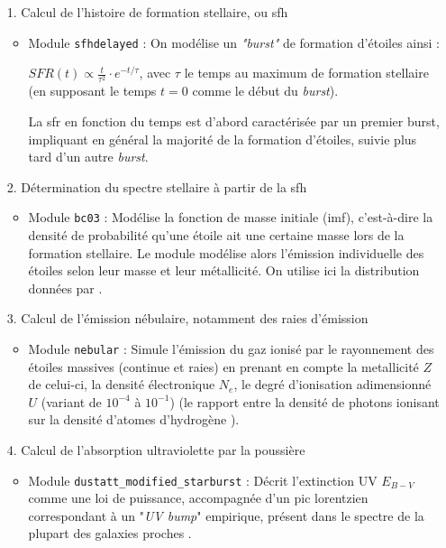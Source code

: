 \documentclass[12pt, a4paper]{article}
\begin{document}
\begin{itemize}
  \item[1.] Calcul de l'histoire de formation stellaire, ou \gls{sfh}
  \begin{itemize}
    \item Module \texttt{sfhdelayed} : On modélise un \textit{"burst"} de formation d'étoiles ainsi :
    
     $SFR(t) \propto \frac{t}{\tau^2} \cdot e^{-t/\tau}$, avec $\tau$ le temps au maximum de formation stellaire (en supposant le temps $t=0$ comme le début du \textit{burst}).

    La \gls{sfr} en fonction du temps est d'abord caractérisée par un premier burst, impliquant en général la majorité de la formation d'étoiles, suivie plus tard d'un autre \textit{burst}.
  \end{itemize}

  \item[2.] Détermination du spectre stellaire à partir de la \gls{sfh}
  \begin{itemize}
    \item Module \texttt{bc03} : Modélise la fonction de masse initiale (\gls{imf}), c'est-à-dire la densité de probabilité qu'une étoile ait une certaine masse lors de la formation stellaire. Le module modélise alors l'émission individuelle des étoiles selon leur masse et leur métallicité. On utilise ici la distribution données par \cite{2003PASP..115..763C}.
  \end{itemize}

  \item[3.] Calcul de l'émission nébulaire, notamment des raies d'émission
  \begin{itemize}
    \item Module \texttt{nebular} : Simule l'émission du gaz ionisé par le rayonnement des étoiles massives (continue et raies) en prenant en compte la metallicité $Z$ de celui-ci, la densité électronique $N_e$, le degré d'ionisation adimensionné $U$ (variant de $10^{-4}$ à $10^{-1}$) (le rapport entre la densité de photons ionisant sur la densité d'atomes d'hydrogène \parencite{Astrophysics-of-the-Diffuse-Universe}).
  \end{itemize}

  \item[4.] Calcul de l'absorption ultraviolette par la poussière
  \begin{itemize}
    \item Module \texttt{dustatt\_modified\_starburst} : Décrit l'extinction UV $E_{B-V}$ comme une loi de puissance, accompagnée d'un pic lorentzien correspondant à un "\textit{UV bump}" empirique, présent dans le spectre de la plupart des galaxies proches \parencite{10.1093/mnras/stac1313}.
  \end{itemize}


\end{itemize}
\end{document}
